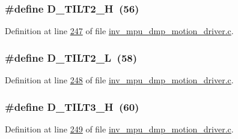 \subsubsection[{\texorpdfstring{D\+\_\+\+T\+I\+L\+T2\+\_\+H}{D_TILT2_H}}]{\setlength{\rightskip}{0pt plus 5cm}\#define D\+\_\+\+T\+I\+L\+T2\+\_\+H~(56)}\hypertarget{group___d_r_i_v_e_r_s_ga9325b74799bbe82c52821c1a3d31cb0a}{}\label{group___d_r_i_v_e_r_s_ga9325b74799bbe82c52821c1a3d31cb0a}


Definition at line \hyperlink{inv__mpu__dmp__motion__driver_8c_source_l00247}{247} of file \hyperlink{inv__mpu__dmp__motion__driver_8c_source}{inv\+\_\+mpu\+\_\+dmp\+\_\+motion\+\_\+driver.\+c}.

\subsubsection[{\texorpdfstring{D\+\_\+\+T\+I\+L\+T2\+\_\+L}{D_TILT2_L}}]{\setlength{\rightskip}{0pt plus 5cm}\#define D\+\_\+\+T\+I\+L\+T2\+\_\+L~(58)}\hypertarget{group___d_r_i_v_e_r_s_ga1f94ccf82d2693832423d759dba5dbfa}{}\label{group___d_r_i_v_e_r_s_ga1f94ccf82d2693832423d759dba5dbfa}


Definition at line \hyperlink{inv__mpu__dmp__motion__driver_8c_source_l00248}{248} of file \hyperlink{inv__mpu__dmp__motion__driver_8c_source}{inv\+\_\+mpu\+\_\+dmp\+\_\+motion\+\_\+driver.\+c}.

\subsubsection[{\texorpdfstring{D\+\_\+\+T\+I\+L\+T3\+\_\+H}{D_TILT3_H}}]{\setlength{\rightskip}{0pt plus 5cm}\#define D\+\_\+\+T\+I\+L\+T3\+\_\+H~(60)}\hypertarget{group___d_r_i_v_e_r_s_ga296360133bdb8e75a844083e52ae6542}{}\label{group___d_r_i_v_e_r_s_ga296360133bdb8e75a844083e52ae6542}


Definition at line \hyperlink{inv__mpu__dmp__motion__driver_8c_source_l00249}{249} of file \hyperlink{inv__mpu__dmp__motion__driver_8c_source}{inv\+\_\+mpu\+\_\+dmp\+\_\+motion\+\_\+driver.\+c}.

